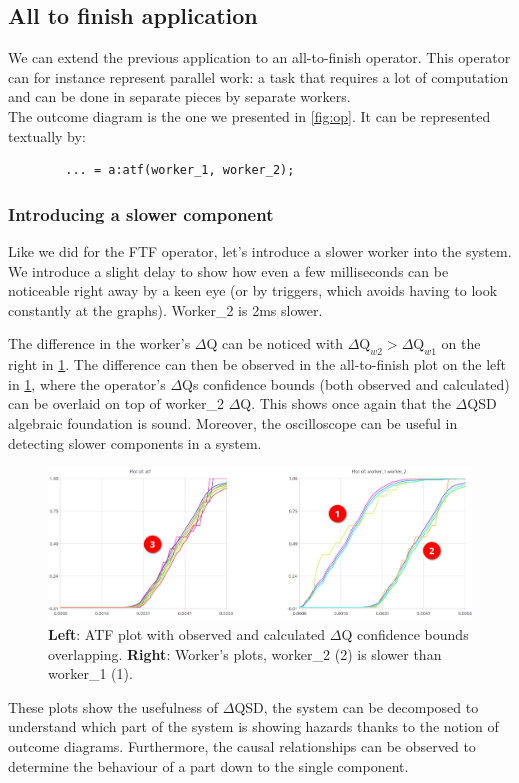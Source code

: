 \subsection{All to finish application}
    We can extend the previous application to an all-to-finish operator. This operator can for instance represent parallel work: a task that requires a lot of computation and can be done in separate pieces by separate workers. \cite{dq-tut} \\
    The outcome diagram is the one we presented in \cref{fig:op}. It can be represented textually by:
    \begin{verbatim}
        ... = a:atf(worker_1, worker_2);
    \end{verbatim}

        \subsubsection{Introducing a slower component}
            Like we did for the FTF operator, let's introduce a slower worker into the system. We introduce a slight delay to show how even a few milliseconds can be noticeable right away by a keen eye (or by triggers, which avoids having to look constantly at the graphs). Worker\_2 is 2ms slower.
 
            The difference in the worker's $\Delta$Q can be noticed with $\Delta \text{Q}_{w2} > \Delta \text{Q}_{w1}$ on the right in \cref{fig:slower_atf}. The difference can then be observed in the all-to-finish plot on the left in \cref{fig:slower_atf}, where the operator's $\Delta$Qs confidence bounds (both observed and calculated) can be overlaid on top of worker\_2 $\Delta$Q. This shows once again that the $\Delta$QSD algebraic foundation is sound. Moreover, the oscilloscope can be useful in detecting slower components in a system.

            \begin{figure}[H]
                \begin{center}
                    \includegraphics[scale = 0.5]{img/overload_2/w1w2atfa.png}
                \end{center}
                \caption{\textbf{Left}: ATF plot with observed and calculated $\Delta$Q confidence bounds overlapping. \textbf{Right}: Worker's plots, worker\_2 (2) is slower than worker\_1 (1).}
                \label{fig:slower_atf}
            \end{figure}

    These plots show the usefulness of $\Delta$QSD, the system can be decomposed to understand which part of the system is showing hazards thanks to the notion of outcome diagrams. Furthermore, the causal relationships can be observed to determine the behaviour of a part down to the single component.
